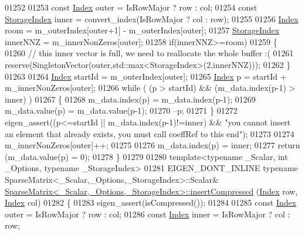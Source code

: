 \begin{DoxyCode}
01252 
01253   \textcolor{keyword}{const} \hyperlink{group___core___module_a554f30542cc2316add4b1ea0a492ff02}{Index} outer = IsRowMajor ? row : col;
01254   \textcolor{keyword}{const} \hyperlink{group___sparse_core___module_a0b540ba724726ebe953f8c0df06081ed}{StorageIndex} inner = convert\_index(IsRowMajor ? col : row);
01255 
01256   \hyperlink{group___core___module_a554f30542cc2316add4b1ea0a492ff02}{Index} room = m\_outerIndex[outer+1] - m\_outerIndex[outer];
01257   \hyperlink{group___sparse_core___module_a0b540ba724726ebe953f8c0df06081ed}{StorageIndex} innerNNZ = m\_innerNonZeros[outer];
01258   \textcolor{keywordflow}{if}(innerNNZ>=room)
01259   \{
01260     \textcolor{comment}{// this inner vector is full, we need to reallocate the whole buffer :(}
01261     reserve(SingletonVector(outer,std::max<StorageIndex>(2,innerNNZ)));
01262   \}
01263 
01264   \hyperlink{group___core___module_a554f30542cc2316add4b1ea0a492ff02}{Index} startId = m\_outerIndex[outer];
01265   \hyperlink{group___core___module_a554f30542cc2316add4b1ea0a492ff02}{Index} p = startId + m\_innerNonZeros[outer];
01266   \textcolor{keywordflow}{while} ( (p > startId) && (m\_data.index(p-1) > inner) )
01267   \{
01268     m\_data.index(p) = m\_data.index(p-1);
01269     m\_data.value(p) = m\_data.value(p-1);
01270     --p;
01271   \}
01272   eigen\_assert((p<=startId || m\_data.index(p-1)!=inner) && \textcolor{stringliteral}{"you cannot insert an element that already
       exists, you must call coeffRef to this end"});
01273 
01274   m\_innerNonZeros[outer]++;
01275 
01276   m\_data.index(p) = inner;
01277   \textcolor{keywordflow}{return} (m\_data.value(p) = 0);
01278 \}
01279 
01280 \textcolor{keyword}{template}<\textcolor{keyword}{typename} \_Scalar, \textcolor{keywordtype}{int} \_Options, \textcolor{keyword}{typename} \_StorageIndex>
01281 EIGEN\_DONT\_INLINE \textcolor{keyword}{typename} SparseMatrix<\_Scalar,\_Options,\_StorageIndex>::Scalar& 
      \hyperlink{group___sparse_core___module_class_eigen_1_1_sparse_matrix}{SparseMatrix<\_Scalar,\_Options,\_StorageIndex>::insertCompressed}
      (\hyperlink{group___core___module_a554f30542cc2316add4b1ea0a492ff02}{Index} row, \hyperlink{group___core___module_a554f30542cc2316add4b1ea0a492ff02}{Index} col)
01282 \{
01283   eigen\_assert(isCompressed());
01284 
01285   \textcolor{keyword}{const} \hyperlink{group___core___module_a554f30542cc2316add4b1ea0a492ff02}{Index} outer = IsRowMajor ? row : col;
01286   \textcolor{keyword}{const} \hyperlink{group___core___module_a554f30542cc2316add4b1ea0a492ff02}{Index} inner = IsRowMajor ? col : row;

\end{DoxyCode}
